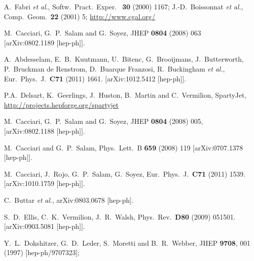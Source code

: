 \documentclass[12pt,a4]{article}
\begin{document}
\begin{thebibliography}{99}
A.~Fabri {\it et al.},
Softw.~Pract.~Exper.~ {\bf 30} (2000) 1167;
J.-D.~Boissonnat {\it et al.},
Comp.~Geom.~{\bf 22} (2001) 5; \url{http://www.cgal.org/}
  
  M.~Cacciari, G.~P.~Salam and G.~Soyez,
  JHEP {\bf 0804} (2008) 063
  [arXiv:0802.1189 [hep-ph]].

  A.~Abdesselam, E.~B.~Kuutmann, U.~Bitenc, G.~Brooijmans, J.~Butterworth, P.~Bruckman de Renstrom, D.~Buarque Franzosi, R.~Buckingham {\it et al.},
  Eur.\ Phys.\ J.\  {\bf C71 } (2011)  1661.
  [arXiv:1012.5412 [hep-ph]].

 P.A.~Delsart, K.~Geerlings, J.~Huston,
  B.~Martin and C.~Vermilion, SpartyJet,
  \url{http://projects.hepforge.org/spartyjet}

  M.~Cacciari, G.~P.~Salam and G.~Soyez,
  JHEP {\bf 0804} (2008) 005,
  [arXiv:0802.1188 [hep-ph]].

  M.~Cacciari and G.~P.~Salam,
  Phys.\ Lett.\  B {\bf 659} (2008) 119
  [arXiv:0707.1378 [hep-ph]].

  M.~Cacciari, J.~Rojo, G.~P.~Salam, G.~Soyez,
  Eur.\ Phys.\ J.\  {\bf C71 } (2011)  1539.
  [arXiv:1010.1759 [hep-ph]].

  C.~Buttar {\it et al.},
  arXiv:0803.0678 [hep-ph].

  S.~D.~Ellis, C.~K.~Vermilion, J.~R.~Walsh,
  Phys.\ Rev.\  {\bf D80 } (2009)  051501.
  [arXiv:0903.5081 [hep-ph]].


  Y.~L.~Dokshitzer, G.~D.~Leder, S.~Moretti and B.~R.~Webber,
  JHEP {\bf 9708}, 001 (1997)
  [hep-ph/9707323];


\end{thebibliography}
\end{document}
